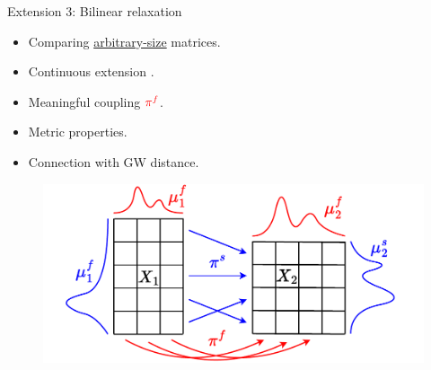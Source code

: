 \documentclass{beamer}
\newcommand{\pif}{{\color{red}{\pi^f}}}
\begin{document}
\begin{frame}{Extension 3: Bilinear relaxation}
\vspace{-0.3cm}
\begin{minipage}[t]{0.6\linewidth}
  \begin{itemize}
    \item Comparing \underline{arbitrary-size} matrices.
    \item Continuous extension \parencite{Chowdhury21b}.
    \item Meaningful {\color{red}{feature}} coupling $\pif$.
    \item Metric properties.
    \item Connection with GW distance.
  \end{itemize}
  \end{minipage}%
  \hfill%
  \hspace{-6cm}
  \begin{minipage}[t]{0.55\linewidth}
    \vspace{0.5cm}
  \begin{figure}
    \centering
    \includegraphics[width=1.15\linewidth, keepaspectratio=true]{OT_new/coot_matrix_ot.pdf}
  \end{figure}
  \end{minipage}
\end{frame}
\end{document}
